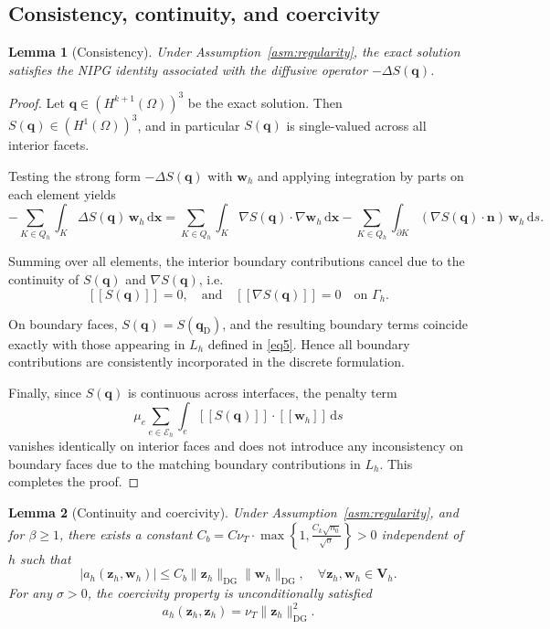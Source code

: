 \documentclass[pdflatex,sn-mathphys-num]{sn-jnl}%
\theoremstyle{thmstyleone}%
\newtheorem{lemma}{Lemma}
\theoremstyle{thmstyletwo}%
\theoremstyle{thmstylethree}%
\begin{document}
\subsection{Consistency, continuity, and coercivity}\label{sec:Consistency}

\begin{lemma}[Consistency]
\label{lma:consistency}
Under Assumption~\ref{asm:regularity}, the exact solution satisfies the NIPG identity associated with the diffusive operator $-\Delta S(\mathbf q)$.
\end{lemma}
\begin{proof}
Let $\mathbf{q} \in (H^{k+1}(\Omega))^3$ be the exact solution. Then $S(\mathbf{q}) \in (H^{1}(\Omega))^3$, and in particular $S(\mathbf{q})$ is single-valued across all interior facets.

Testing the strong form $-\Delta S(\mathbf{q})$ with $\mathbf{w}_h$ and applying integration by parts on each element yields
\[
-\sum_{K \in Q_h}\int_K \Delta S(\mathbf{q})\,\mathbf{w}_h\,\mathrm{d}\mathbf{x}
=
\sum_{K \in Q_h}\int_K \nabla S(\mathbf{q}) \cdot \nabla \mathbf{w}_h\,\mathrm{d}\mathbf{x}
-
\sum_{K \in Q_h}\int_{\partial K} (\nabla S(\mathbf{q})\cdot \mathbf{n})\,\mathbf{w}_h\,\mathrm{d}s.
\]

Summing over all elements, the interior boundary contributions cancel due to the continuity of $S(\mathbf{q})$ and $\nabla S(\mathbf{q})$, i.e.
\[
[[S(\mathbf{q})]] = 0, \quad \text{and} \quad [[\nabla S(\mathbf{q})]] = 0 \quad \text{on } \Gamma_h.
\]

On boundary faces, $S(\mathbf{q}) = S(\mathbf{q}_{\mathrm{D}})$, and the resulting boundary terms coincide exactly with those appearing in $L_h$ defined in \eqref{eq5}. Hence all boundary contributions are consistently incorporated in the discrete formulation.

Finally, since $S(\mathbf{q})$ is continuous across interfaces, the penalty term
\[
\mu_e \sum_{e\in\mathcal{E}_h} \int_e [[S(\mathbf{q})]] \cdot [[\mathbf{w}_h]]\,\mathrm{d}s
\]
vanishes identically on interior faces and does not introduce any inconsistency on boundary faces due to the matching boundary contributions in $L_h$.
This completes the proof.
\end{proof}

\begin{lemma}[Continuity and coercivity]
\label{lma:coercivity}
Under Assumption~\ref{asm:regularity}, and for $\beta\ge 1$, there exists a constant $C_b=C \nu_T \cdot \max \left\{1,\frac{C_k \sqrt{n_0}}{\sqrt{\sigma}}\right\}>0$ independent of $h$ such that
\begin{equation}
\label{eq13}
|a_h(\mathbf{z}_h,\mathbf{w}_h)|
\le C_b\|\mathbf{z}_h\|_{\mathrm{DG}}\|\mathbf{w}_h\|_{\mathrm{DG}},
\quad
\forall \mathbf{z}_h,\mathbf{w}_h\in\mathbf{V}_h.
\end{equation}
For any $\sigma>0$, the coercivity property is unconditionally satisfied
\begin{equation}
\label{eq14}
a_h(\mathbf{z}_h,\mathbf{z}_h)=\nu_T\|\mathbf{z}_h\|_{\mathrm{DG}}^2.
\end{equation}
\end{lemma}
\end{document}
